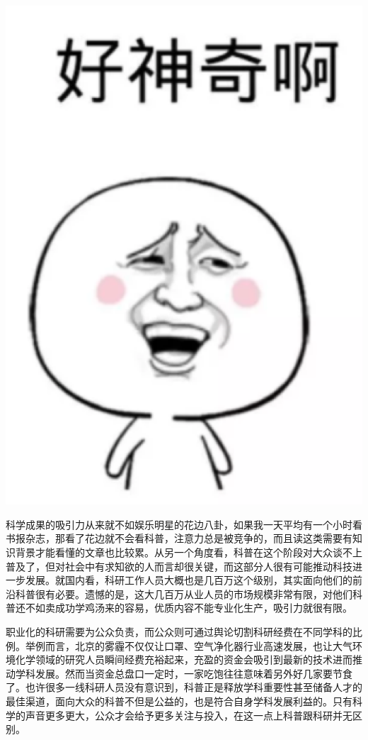 \documentclass[]{book}
\begin{document}
\includegraphics[width=5.97in]{images/pops5}

科学成果的吸引力从来就不如娱乐明星的花边八卦，如果我一天平均有一个小时看书报杂志，那看了花边就不会看科普，注意力总是被竞争的，而且读这类需要有知识背景才能看懂的文章也比较累。从另一个角度看，科普在这个阶段对大众谈不上普及了，但对社会中有求知欲的人而言却很关键，而这部分人很有可能推动科技进一步发展。就国内看，科研工作人员大概也是几百万这个级别，其实面向他们的前沿科普很有必要。遗憾的是，这大几百万从业人员的市场规模非常有限，对他们科普还不如卖成功学鸡汤来的容易，优质内容不能专业化生产，吸引力就很有限。

职业化的科研需要为公众负责，而公众则可通过舆论切割科研经费在不同学科的比例。举例而言，北京的雾霾不仅仅让口罩、空气净化器行业高速发展，也让大气环境化学领域的研究人员瞬间经费充裕起来，充盈的资金会吸引到最新的技术进而推动学科发展。然而当资金总盘口一定时，一家吃饱往往意味着另外好几家要节食了。也许很多一线科研人员没有意识到，科普正是释放学科重要性甚至储备人才的最佳渠道，面向大众的科普不但是公益的，也是符合自身学科发展利益的。只有科学的声音更多更大，公众才会给予更多关注与投入，在这一点上科普跟科研并无区别。
\end{document}
